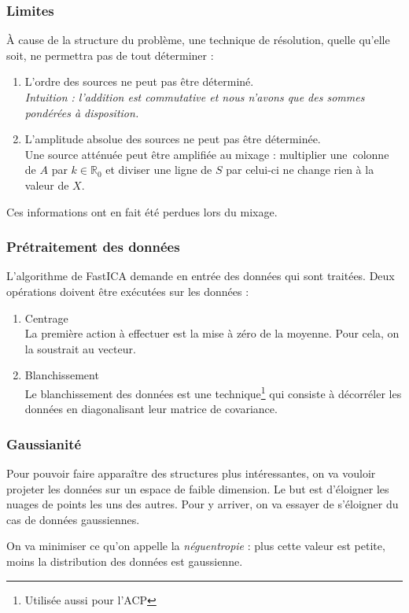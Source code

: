 \documentclass[compress]{beamer}
\newcommand{\esR}{\mathbb{R}}
\begin{document}
\begin{frame}
	\frametitle{Limites}
	À cause de la structure du problème, une technique de résolution,
	quelle qu'elle soit, ne permettra pas de tout déterminer :
	\pause
	\begin{enumerate}
	\item L'ordre des sources ne peut pas être déterminé.
	\pause
		\\\textit{Intuition : l'addition est commutative et nous n'avons que
			des sommes pondérées à disposition.}
	\pause
	\item L'amplitude absolue des sources ne peut pas être déterminée.
	\pause
		\\Une source atténuée peut être amplifiée au mixage :
			multiplier une~colonne de $A$ par $k\in\esR_0$ et
			diviser une ligne de $S$ par celui-ci ne change rien à
			la valeur de $X$.
	\pause
	\end{enumerate}

	Ces informations ont en fait été perdues lors du mixage.
\end{frame}
\begin{frame}
	\frametitle{Prétraitement des données}
	L'algorithme de FastICA demande en entrée des données qui sont traitées.
	Deux opérations doivent être exécutées sur les données :
	\pause
	\begin{enumerate}
	\item Centrage
		\pause
			\\La première action à effectuer est la mise à zéro de la moyenne.
			Pour cela, on la soustrait au vecteur.
			\pause
	\item Blanchissement
		\pause
			\\Le blanchissement des données est une
			technique\footnote{Utilisée aussi pour l'ACP}
			qui consiste à décorréler les données en diagonalisant
			leur matrice de covariance.
	
	\end{enumerate}
\end{frame}
\begin{frame}
	\frametitle{Gaussianité}
	Pour pouvoir faire apparaître des structures plus intéressantes,
	on va vouloir projeter les données sur un espace de faible dimension.
	Le but est d'éloigner les nuages de points les uns des autres.
	Pour y arriver, on va essayer de s'éloigner du cas de données gaussiennes.
	\pause
	\vfill

	On va minimiser ce qu'on appelle la \textit{néguentropie} :
	plus cette valeur est petite, moins la distribution des données
	est gaussienne.
\end{frame}
\end{document}
